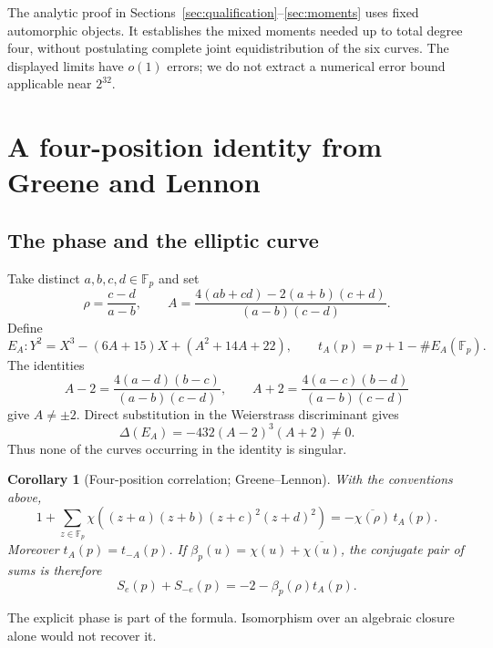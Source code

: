 \documentclass[11pt]{article}
\newtheorem{corollary}[theorem]{Corollary}
\theoremstyle{definition}\newtheorem{definition}[theorem]{Definition}
\newcommand{\Fp}{\mathbb F_p}
\begin{document}
The analytic proof in Sections~\ref{sec:qualification}--\ref{sec:moments}
uses fixed automorphic objects. It establishes the mixed moments
needed up to total degree four, without postulating complete joint
equidistribution of the six curves.
The displayed limits have $o(1)$ errors; we do not extract a
numerical error bound applicable near $2^{32}$.

\section{A four-position identity from Greene and Lennon}\label{sec:fourpositions}
\subsection{The phase and the elliptic curve}
Take distinct $a,b,c,d\in\Fp$ and set
\begin{equation}\label{eq:parameters}
 \rho=\frac{c-d}{a-b},\qquad
 A=\frac{4(ab+cd)-2(a+b)(c+d)}{(a-b)(c-d)}.
\end{equation}
Define
\begin{equation}\label{eq:EA}
 E_A:Y^2=X^3-(6A+15)X+(A^2+14A+22),\qquad
 t_A(p)=p+1-\#E_A(\Fp).
\end{equation}
The identities
\[
 A-2=\frac{4(a-d)(b-c)}{(a-b)(c-d)},\qquad
 A+2=\frac{4(a-c)(b-d)}{(a-b)(c-d)}
\]
give $A\ne\pm2$. Direct substitution in the Weierstrass
discriminant gives
\begin{equation}\label{eq:disc}
 \Delta(E_A)=-432(A-2)^3(A+2)\ne0.
\end{equation}
Thus none of the curves occurring in the identity is singular.

\begin{corollary}[Four-position correlation; Greene--Lennon]\label{thm:fourpositions}
With the conventions above,
\begin{equation}\label{eq:fouridentity}
 1+\sum_{z\in\Fp}
 \chi((z+a)(z+b)(z+c)^2(z+d)^2)
 =-\overline{\chi(\rho)}\,t_A(p).
\end{equation}
Moreover $t_A(p)=t_{-A}(p)$.
If $\beta_p(u)=\chi(u)+\overline{\chi(u)}$, the conjugate pair
of sums is therefore
\begin{equation}\label{eq:pair}
 S_e(p)+S_{-e}(p)=-2-\beta_p(\rho)t_A(p).
\end{equation}
\end{corollary}
The explicit phase is part of the formula. Isomorphism over an
algebraic closure alone would not recover it.
\end{document}
